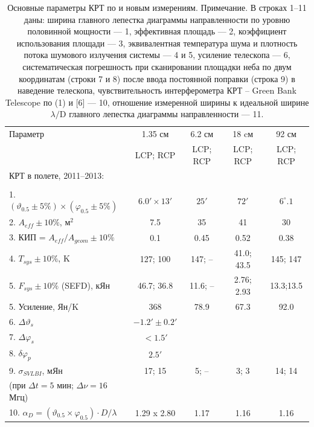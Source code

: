 \begin{table}[tbh]
\caption{Основные параметры КРТ по \cite{Kardashev_2013_rus} и новым измерениям.
\tiny{Примечание. В строках 1--11 даны: ширина главного лепестка диаграммы направленности по уровню
половинной мощности --- 1, эффективная площадь --- 2, коэффициент использования площади --- 3,
эквивалентная температура шума и плотность потока шумового излучения системы --- 4 и 5, усиление
телескопа --- 6, систематическая погрешность при сканировании площадки неба
по двум координатам (строки 7 и 8) после ввода постоянной поправки (строка 9) в наведение телескопа,
чувствительность интерферометра КРТ – Green Bank Telescope по (1) и [6] --- 10, отношение
измеренной ширины к идеальной ширине $\lambda/\text{D}$ главного лепестка диаграммы направленности
--- 11.}}
\bigskip
\label{tab:srt_params3}
\centering
    \begin{SingleSpace}
    \tiny
        \begin{tabular}{lcccc}
        \toprule
Параметр              & 1.35 см  & 6.2 см   & 18 cм    & 92 см\\
                      & LCP; RCP & LCP; RCP & LCP; RCP & LCP; RCP\\

        \midrule
КРТ в полете, 2011--2013: & & & &\\
                       & & & &\\
1. $(\vartheta_{0.5} \pm 5 \%) \times (\varphi_{0.5} \pm 5 \%)$ & $6.0' \times 13'$ & $25'$ &$72'$
 & $6^\circ.1$ \\
2. $A_{eff} \pm 10\%$, м$^2$                  & 7.5        & 35     & 41         & 30\\
3. КИП = $A_{eff}/A_{geom} \pm 10\%$          & 0.1        & 0.45   & 0.52       & 0.38\\
4. $T_{sys} \pm 10\%$, K                      & 127; 100   & 147;  -- & 41.0; 43.5 & 145; 147\\
5. $F_{sys} \pm 10\%$ (SEFD), кЯн             & 46.7; 36.8 & 11.6; --& 2.76; 2.93 & 13.3;13.5\\
5. Усиление, Ян/K                             & 368        &  78.9  & 67.3       & 92.0     \\
6. $\Delta \vartheta_s$  & $-1.2' \pm 0.2'$    & & & \\
7. $\Delta \varphi_s$    & $< 1.5'$            & & & \\
8. $\delta \varphi_p$    & $2.5'$              & & & \\
9. $\sigma_{SVLBI}$, мЯн          & 17; 15 &  5; --  & 3; 3    & 14; 14\\
   (при $\Delta t = 5$ мин; $\Delta \nu = 16$ Мгц)            &        &        &         &
\\
10. $\alpha_D = (\vartheta_{0.5} \times \varphi_{0.5}) \cdot D / \lambda$ &  1.29 x 2.80 & 1.17 &
1.16 & 1.16\\
        \bottomrule
        \end{tabular}
    \end{SingleSpace}
\end{table}

